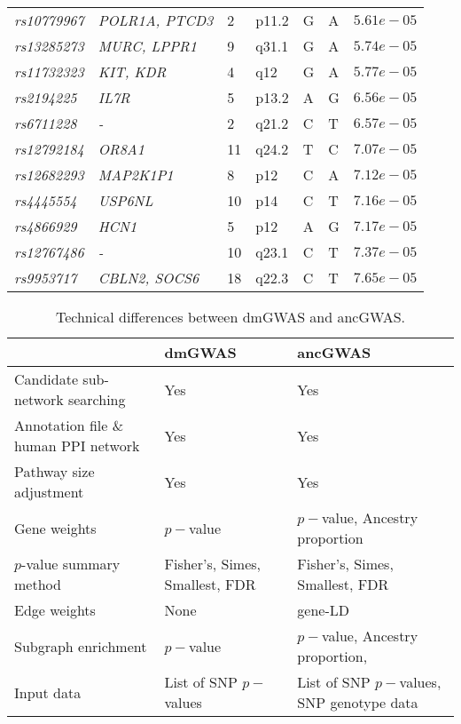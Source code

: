\documentclass[10pt]{article}
\begin{document}
\begin{table}[!htbp]
{\begin{tabular}{lllllll}
\textit{rs10779967}&\textit{POLR1A, PTCD3}&2&p11.2&G&A&$5.61e-05$ \\[2pt]
\textit{rs13285273}&\textit{MURC, LPPR1}&9&q31.1&G&A&$5.74e-05$ \\[2pt]
\textit{rs11732323}&\textit{KIT, KDR}&4&q12&G&A&$5.77e-05$ \\[2pt]
\textit{rs2194225}&\textit{IL7R}&5&p13.2&A&G&$6.56e-05$ \\[2pt]
\textit{rs6711228}&\textit{-}&2&q21.2&C&T&$6.57e-05$ \\[2pt]
\textit{rs12792184}&\textit{OR8A1}&11&q24.2&T&C&$7.07e-05$ \\[2pt]
\textit{rs12682293}&\textit{MAP2K1P1}&8&p12&C&A&$7.12e-05$ \\[2pt]
\textit{rs4445554}&\textit{USP6NL}&10&p14&C&T&$7.16e-05$ \\[2pt]
\textit{rs4866929}&\textit{HCN1}&5&p12&A&G&$7.17e-05$ \\[2pt]
\textit{rs12767486}&\textit{-}&10&q23.1&C&T&$7.37e-05$ \\[2pt]
\textit{rs9953717}&\textit{CBLN2, SOCS6}&18&q22.3&C&T&$7.65e-05$ \\[1.5pt]\hline\hline
\end{tabular}}
\label{tab:gwascancer}
\end{table}
\newpage

\begin{table}[H]
\captionsetup{justification=raggedright,
singlelinecheck=false}
\caption{{\small Technical differences between dmGWAS and ancGWAS.}}
\begin{centering}
%
\begin{tabular}{lp{3.5cm}p{5cm}}
                         & dmGWAS    &        ancGWAS  \\[2pt]
\hline
Candidate sub-network searching & Yes & Yes \\[2pt]
Annotation file \&  human PPI network & Yes & Yes \\[2pt]
Pathway size adjustment & Yes & Yes \\[2pt]
Gene weights & $p-$value & $p-$value, Ancestry proportion \\[2pt]
$p$-value summary method  & Fisher's, Simes, Smallest, FDR 	&  Fisher's, Simes, Smallest, FDR \\[2pt]
Edge weights & None	& gene-LD \\[2pt]
Subgraph enrichment 	& $p-$value & $p-$value, Ancestry proportion, \\[2pt]
Input data & List of SNP $p-$values & List of SNP $p-$values, SNP genotype data \\[2pt]
\end{tabular}
\par\end{centering}
\label{tab:diff}
\end{table}
\end{document}
